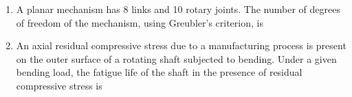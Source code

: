\documentclass[journal,12pt,onecolumn]{IEEEtran}
\begin{document}
\begin{enumerate}
          \begin{figure}[H]
              \centering
              \caption{}
              \label{q10}
          \end{figure}

          \begin{enumerate}
          \end{enumerate}

    \item A planar mechanism has 8 links and 10 rotary joints. The number of degrees of freedom of the mechanism, using Greubler's criterion, is\\

          \begin{enumerate}
          \end{enumerate}

    \item An axial residual compressive stress due to a manufacturing process is present on the outer surface of a rotating shaft subjected to bending. Under a given bending load, the fatigue life of the shaft in the presence of residual compressive stress is\\


\end{enumerate}
\end{document}
